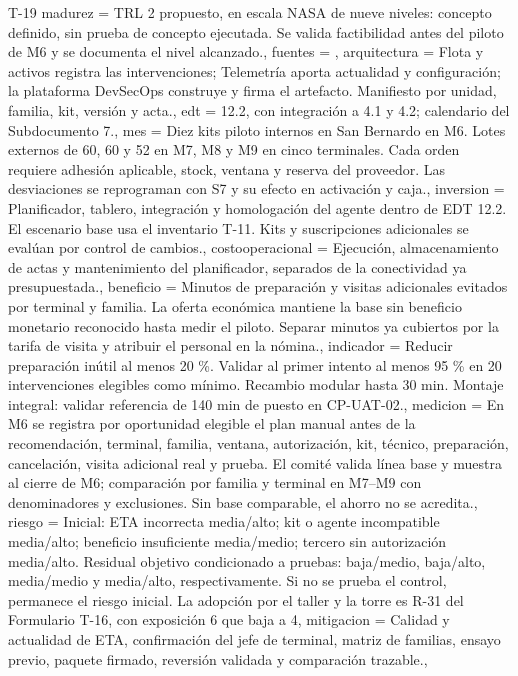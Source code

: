 \begin{formulario}{T-19}
{  madurez = {TRL 2 propuesto, en escala NASA de nueve niveles: concepto definido, sin prueba de concepto ejecutada. Se valida factibilidad antes del piloto de M6 y se documenta el nivel alcanzado.},
  fuentes = {\parencite{d3_nasa_trl,d3_device_twins,d3_device_update}},
  arquitectura = {Flota y activos registra las intervenciones; Telemetría aporta actualidad y configuración; la plataforma DevSecOps construye y firma el artefacto. Manifiesto por unidad, familia, kit, versión y acta.},
  edt = {12.2, con integración a 4.1 y 4.2; calendario del Subdocumento 7.},
  mes = {Diez kits piloto internos en San Bernardo en M6. Lotes externos de 60, 60 y 52 en M7, M8 y M9 en cinco terminales. Cada orden requiere adhesión aplicable, stock, ventana y reserva del proveedor. Las desviaciones se reprograman con S7 y su efecto en activación y caja.},
  inversion = {Planificador, tablero, integración y homologación del agente dentro de EDT 12.2. El escenario base usa el inventario T-11. Kits y suscripciones adicionales se evalúan por control de cambios.},
  costooperacional = {Ejecución, almacenamiento de actas y mantenimiento del planificador, separados de la conectividad ya presupuestada.},
  beneficio = {Minutos de preparación y visitas adicionales evitados por terminal y familia. La oferta económica mantiene la base sin beneficio monetario reconocido hasta medir el piloto. Separar minutos ya cubiertos por la tarifa de visita y atribuir el personal en la nómina.},
  indicador = {Reducir preparación inútil al menos 20 \%. Validar al primer intento al menos 95 \% en 20 intervenciones elegibles como mínimo. Recambio modular hasta 30 min. Montaje integral: validar referencia de 140 min de puesto en CP-UAT-02.},
  medicion = {En M6 se registra por oportunidad elegible el plan manual antes de la recomendación, terminal, familia, ventana, autorización, kit, técnico, preparación, cancelación, visita adicional real y prueba. El comité valida línea base y muestra al cierre de M6; comparación por familia y terminal en M7–M9 con denominadores y exclusiones. Sin base comparable, el ahorro no se acredita.},
  riesgo = {Inicial: ETA incorrecta media/alto; kit o agente incompatible media/alto; beneficio insuficiente media/medio; tercero sin autorización media/alto. Residual objetivo condicionado a pruebas: baja/medio, baja/alto, media/medio y media/alto, respectivamente. Si no se prueba el control, permanece el riesgo inicial. La adopción por el taller y la torre es R-31 del Formulario T-16, con exposición 6 que baja a 4},
  mitigacion = {Calidad y actualidad de ETA, confirmación del jefe de terminal, matriz de familias, ensayo previo, paquete firmado, reversión validada y comparación trazable.},
}
\end{formulario}
